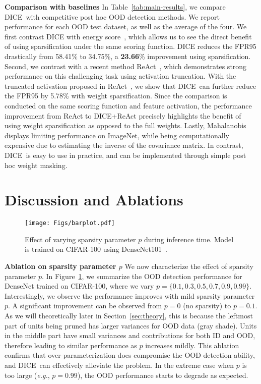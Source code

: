 \documentclass[runningheads]{llncs}
\newcommand{\methodAbbr}{DICE~}
\begin{document}
\noindent \textbf{Comparison with baselines} In Table~\ref{tab:main-results}, we compare \methodAbbr with competitive post hoc OOD detection methods. We report performance for each OOD test dataset, as well as the average of the four. 
We first contrast DICE with energy score~\cite{liu2020energy}, which allows us to see the direct benefit of using sparsification under the same scoring function. DICE reduces
the FPR95 drastically from 58.41\% to 34.75\%, a \textbf{23.66}\% improvement using sparsification.  
Second, we contrast with a recent method ReAct~\cite{sun2021react}, which demonstrates strong performance on this challenging task using activation truncation. 
With the truncated activation proposed in ReAct~\cite{sun2021react}, we show that \methodAbbr can further reduce the FPR95 by {5.78}\% with weight sparsification. 
Since the comparison is conducted on the same scoring function and feature activation, the performance improvement from ReAct to DICE+ReAct precisely highlights the benefit of using weight sparsification as opposed to the full weights.
Lastly, Mahalanobis displays limiting performance on ImageNet, while being computationally expensive due to estimating the inverse of the covariance matrix. In contrast, \methodAbbr is easy to use in practice, and can be implemented through simple {post hoc} weight masking. 

\section{Discussion and Ablations}
\label{sec:sparsification}
\begin{figure}[t]
	\begin{center}
		\texttt{[image: Figs/barplot.pdf]}
	\end{center}
	\vspace{-0.3cm}
	\caption{\small Effect of varying sparsity parameter $p$ during inference time. Model is trained on CIFAR-100 using DenseNet101~\cite{huang2017densely}. 
	}
	\vspace{-0.4cm}
	\label{fig:sparsity}
\end{figure}

\noindent \textbf{Ablation on sparsity parameter $p$} 
We now characterize  the effect of sparsity parameter $p$.  In Figure~\ref{fig:sparsity}, we summarize the OOD detection performance for DenseNet trained on CIFAR-100, where we vary $p=\{0.1, 0.3, 0.5, 0.7, 0.9, 0.99\}$.  
Interestingly, we observe the performance improves  with mild sparsity parameter $p$. A significant improvement can be observed from $p=0$ (no sparsity) to $p=0.1$. As we will theoretically later in Section~\ref{sec:theory}, this is because the leftmost part of units being pruned has larger variances for OOD data (gray shade). Units in the middle part have small variances and contributions for both ID and OOD, therefore leading to similar performance as $p$ increases mildly. This ablation confirms that over-parameterization does compromise the OOD detection ability, and \methodAbbr can effectively alleviate the problem. In the extreme case when $p$ is too large (\emph{e.g.}, $p=0.99$), the OOD performance starts to degrade as expected. \\
\end{document}
